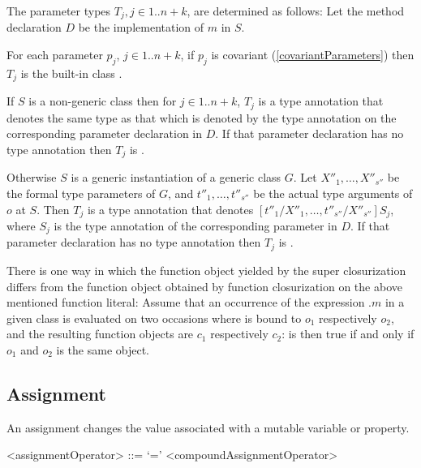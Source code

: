 \documentclass[makeidx]{article}
\begin{document}
\LMHash{}%
The parameter types $T_j, j \in 1 .. n+k$, are determined as follows:
Let the method declaration $D$ be the implementation of $m$ in $S$.

\LMHash{}%
For each parameter $p_j$, $j \in 1 .. n+k$, if $p_j$ is covariant
(\ref{covariantParameters})
then $T_j$ is the built-in class .


\LMHash{}%
If $S$ is a non-generic class then for $j \in 1 .. n+k$,
$T_j$ is a type annotation that denotes the same type as that
which is denoted by the type annotation on the corresponding parameter declaration in $D$.
If that parameter declaration has no type annotation then $T_j$ is \DYNAMIC{}.

\LMHash{}%
Otherwise $S$ is a generic instantiation of a generic class $G$.
Let $X''_1, \ldots, X''_{s''}$ be the formal type parameters of $G$,
and $t''_1, \ldots, t''_{s''}$ be the actual type arguments of $o$ at $S$.
Then $T_j$ is a type annotation that denotes $[t''_1/X''_1, \ldots, t''_{s''}/X''_{s''}]S_j$,
where $S_j$ is the type annotation of the corresponding parameter in $D$.
If that parameter declaration has no type annotation then $T_j$ is \DYNAMIC{}.

\LMHash{}%
There is one way in which
the function object yielded by the super closurization differs from
the function object obtained by function closurization on the above mentioned function literal:
Assume that an occurrence of the expression \SUPER{}.$m$ in a given class
is evaluated on two occasions where \THIS{} is bound to $o_1$ respectively $o_2$,
and the resulting function objects are $c_1$ respectively $c_2$:
 is then true if and only if $o_1$ and $o_2$ is the same object.


\subsection{Assignment}

\LMHash{}%
An assignment changes the value associated with a mutable variable or property.

\begin{grammar}
<assignmentOperator> ::= `='
  \alt <compoundAssignmentOperator>
\end{grammar}
\end{document}

